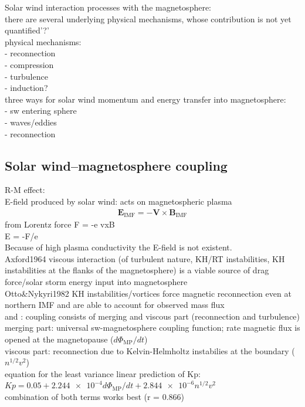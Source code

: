 Solar wind interaction processes with the magnetosphere:\\
there are several underlying physical mechanisms, whose contribution is not yet quantified'?'\\
physical mechanisms:\\
- reconnection\\
- compression\\
- turbulence\\
- induction?\\

three ways for solar wind momentum and energy transfer into magnetosphere:\\
- sw entering sphere\\
- waves/eddies\\
- reconnection\\


\subsection{Solar wind--magnetosphere coupling}
\label{sec:solar_wind_magnetosphere_coupling}

R-M effect:\\
E-field produced by solar wind:	%
acts on magnetospheric plasma\\
\begin{align}
	\textbf{E}_\text{IMF} = -\textbf{V} \times \textbf{B}_\text{IMF}
\end{align}
from Lorentz force F = -e vxB\\
E = -F/e\\
Because of high plasma conductivity the E-field is not existent.\\

Axford1964 viscous interaction (of turbulent nature, KH/RT instabilities, KH instabilities at the flanks of the magnetosphere) is a viable source of drag force/solar storm energy input into magnetosphere\\

Otto\&Nykyri1982 KH instabilities/vortices force magnetic reconnection even at northern IMF and are able to account for observed mass flux\\

\citet{Newell2007} and \citet{Newell2008}: coupling consists of merging and viscous part (reconnection and turbulence)\\
merging part: universal sw-magnetosphere coupling function; rate magnetic flux is opened at the magnetopause ($d\Phi_\text{MP}/dt$)\\
viscous part: reconnection due to Kelvin-Helmholtz instabilies at the boundary ($n^{1/2} v^2$)\\
equation for the least variance linear prediction of Kp: $Kp = 0.05 + \num{2.244e-4} d\Phi_\text{MP}/dt + \num{2.844e-6} n^{1/2} v^2$\\
combination of both terms works best (r = 0.866)\\

